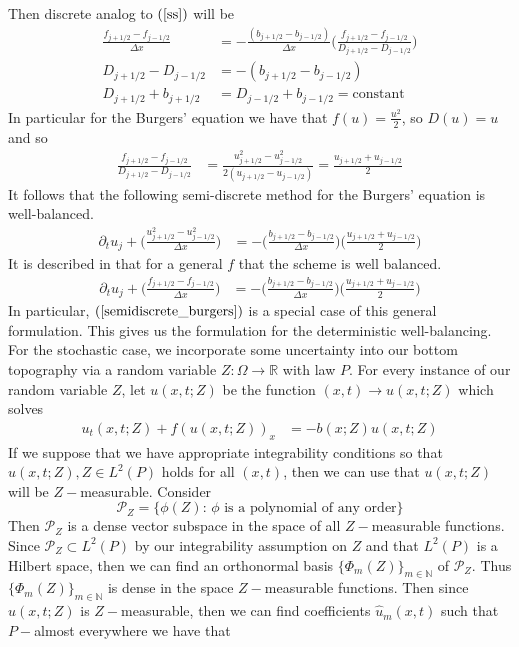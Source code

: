 \documentclass[12pt]{article}
\begin{document}
Then discrete analog to $(\ref{ss})$ will be
\begin{align*}
    \frac{f_{j+1/2}- f_{j-1/2}}{\Delta x} &= -\frac{(b_{j+1/2}-b_{j-1/2})}{\Delta x}\Big(\frac{f_{j+1/2}-f_{j-1/2}}{D_{j+1/2}-D_{j-1/2}}\Big)\\
    D_{j+1/2}-D_{j-1/2} &= -(b_{j+1/2}-b_{j-1/2})\\
    D_{j+1/2}+b_{j+1/2} &= D_{j-1/2}+b_{j-1/2} = \text{constant}
\end{align*}
In particular for the Burgers' equation we have that $f(u) = \frac{u^2}{2}$, so $D(u) = u$ and so
\begin{align*}
    \frac{f_{j+1/2}-f_{j-1/2}}{D_{j+1/2}-D_{j-1/2}} &= \frac{u_{j+1/2}^2 - u_{j-1/2}^2}{2(u_{j+1/2}-u_{j-1/2})} = \frac{u_{j+1/2}+u_{j-1/2}}{2}
\end{align*}
It follows that the following semi-discrete method for the Burgers' equation is well-balanced. 
\begin{align}
    \partial_t u_j + \Big(\frac{u_{j+1/2}^2-u_{j-1/2}^2}{\Delta x}\Big) &= -\Big(\frac{b_{j+1/2}-b_{j-1/2}}{\Delta x}\Big)\Big(\frac{u_{j+1/2}+u_{j-1/2}}{2}\Big)\label{semidiscrete_burgers}
\end{align}
It is described in \cite{Jin2001} that for a general $f$ that the scheme is well balanced. 
\begin{align}
    \partial_t u_j + \Big(\frac{f_{j+1/2}-f_{j-1/2}}{\Delta x}\Big) &= -\Big(\frac{b_{j+1/2}-b_{j-1/2}}{\Delta x}\Big)\Big(\frac{u_{j+1/2}+u_{j-1/2}}{2}\Big) \label{deterministic_wb}
\end{align}
In particular, $(\ref{semidiscrete_burgers})$ is a special case of this general formulation. This gives us the formulation for the deterministic well-balancing.\\ \newline
For the stochastic case, we incorporate some uncertainty into our bottom topography via a random variable $Z:\Omega\to\mathbb{R}$ with law $P$. For every instance of our random variable $Z$, let $u(x,t;Z)$ be the function $(x,t)\to u(x,t;Z)$ which solves
\begin{align} \label{Stochastic_PDE}
    u_t(x,t;Z) + f(u(x,t;Z))_x &= - b(x;Z)u(x,t;Z)
\end{align}
If we suppose that we have appropriate integrability conditions so that $u(x,t;Z),Z\in L^2(P)$ holds for all $(x,t)$, then we can use that $u(x,t;Z)$ will be $Z-$measurable. Consider $$\mathcal{P}_Z = \{\phi(Z):\,\phi\,\,\text{is a polynomial of any order}\}$$ 
Then $\mathcal{P}_Z$ is a dense vector subspace in the space of all $Z-$measurable functions. Since $\mathcal{P}_Z\subset L^2(P)$ by our integrability assumption on $Z$ and that $L^2(P)$ is a Hilbert space, then we can find an orthonormal basis $\{\Phi_m(Z)\}_{m\in\mathbb{N}}$ of $\mathcal{P}_Z$. Thus $\{\Phi_m(Z)\}_{m\in\mathbb{N}}$ is dense in the space $Z-$measurable functions. Then since $u(x,t;Z)$ is $Z-$measurable, then we can find coefficients $\hat{u}_m(x,t)$ such that $P-$almost everywhere we have that
\end{document}
